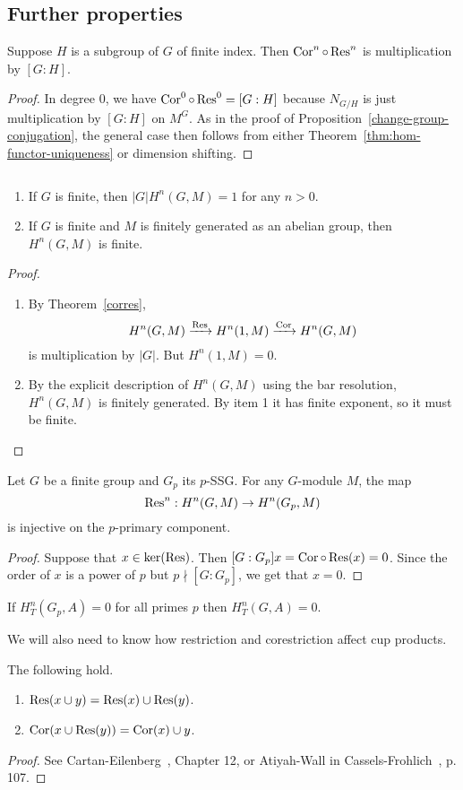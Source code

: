 \subsection{Further properties}
\begin{thm}
Suppose $H$ is a subgroup of $G$ of finite index. Then $\operatorname{Cor}^n\circ \operatorname{Res}^n$ is multiplication by $[G:H]$.
\end{thm}
\begin{proof}
In degree 0, we have $\operatorname{Cor}^0\circ \operatorname{Res}^0=[G:H]$ because $N_{G/H}$ is just multiplication by $[G:H]$ on $M^G$. As in the proof of Proposition~\ref{change-group-conjugation}, the general case then follows from either Theorem~\ref{thm:hom-functor-uniqueness} or dimension shifting.
\end{proof}
\begin{cor}$\,$
\begin{enumerate}
\item If $G$ is finite, then $|G|H^n(G,M)=1$ for any $n>0$.
\item If $G$ is finite and $M$ is finitely generated as an abelian group, then $H^n(G,M)$ is finite.
\end{enumerate}
\end{cor}
\begin{proof}$\,$
\begin{enumerate}
\item
By Theorem~\ref{corres}, 
\[
H^n(G,M)\xrightarrow{\operatorname{Res}} H^n(1,M)\xrightarrow{\operatorname{Cor}} H^n(G,M)
\]
is multiplication by $|G|$. But $H^n(1,M)=0$.
\item
By the explicit description of $H^n(G,M)$ using the bar resolution, $H^n(G,M)$ is finitely generated. By item 1 it has finite exponent, so it must be finite.
\end{enumerate}
\end{proof}
\begin{cor}
Let $G$ be a finite group and $G_p$ its $p$-SSG. For any $G$-module $M$, the map
\[
\operatorname{Res}^n: H^n(G,M)\to H^n(G_p,M)
\]
is injective on the $p$-primary component.
\end{cor}
\begin{proof}
Suppose that $x\in \ker(\operatorname{Res})$. Then $[G:G_p]x=\operatorname{Cor}\circ \operatorname{Res}(x)=0$. Since the order of $x$ is a power of $p$ but $p\nmid [G:G_p]$, we get that $x=0$.
\end{proof}
\begin{cor}
If $H_T^n(G_p,A)=0$ for all primes $p$ then $H_T^n(G,A)=0$.
\end{cor}
We will also need to know how restriction and corestriction affect cup products.
\begin{pr}
The following hold.
\begin{enumerate}
\item $\operatorname{Res}(x\cup y)=\operatorname{Res}(x)\cup \operatorname{Res}(y)$.
\item $\operatorname{Cor}(x\cup \operatorname{Res}(y))=\operatorname{Cor}(x)\cup y$.
\end{enumerate}
\end{pr}
\begin{proof}
See Cartan-Eilenberg~\cite{CE56}, Chapter 12, or Atiyah-Wall in Cassels-Frohlich~\cite{CF69}, p. 107.
\end{proof}
